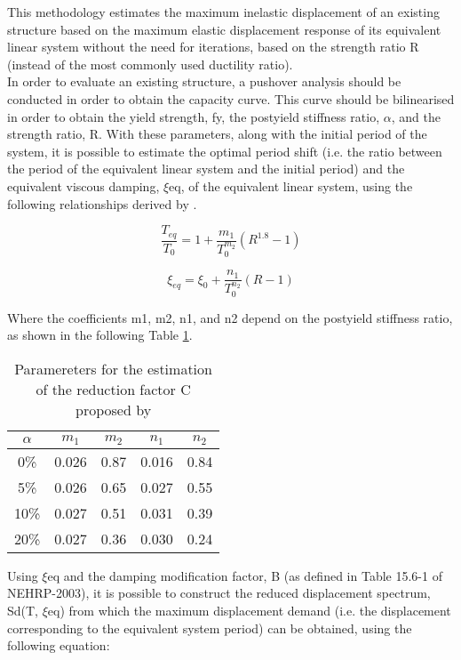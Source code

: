 This methodology estimates the maximum inelastic displacement of an existing structure based on the maximum elastic displacement response of its equivalent linear system without the need for iterations, based on the strength ratio R (instead of the most commonly used ductility ratio).\\
In order to evaluate an existing structure, a pushover analysis should be conducted in order to obtain the capacity curve. This curve should be bilinearised in order to obtain the yield strength, fy, the postyield stiffness ratio, $\alpha$, and the strength ratio, R. With these parameters, along with the initial period of the system, it is possible to estimate the optimal period shift (i.e. the ratio between the period of the equivalent linear system and the initial period) and the equivalent viscous damping, $\xi$eq, of the equivalent linear system, using the following relationships derived by \citep{LinMiranda2008}.
	 
\begin{equation}
\frac{T_{eq}}{T_{0}} = 1 + \frac{m_1}{T_0^{m_2}}\left(R^{1.8}-1\right)
\end{equation} 

\begin{equation}
\xi_{eq} = \xi_{0} + \frac{n_1}{T_0^{n_2}}\left(R-1\right)
\end{equation}   

Where the coefficients m1, m2, n1, and n2 depend on the postyield stiffness ratio, as shown in the following Table \ref{table:LinMiranda2008}.

\begin {table}[htb]
\caption{Paramereters for the estimation of the reduction factor C proposed by \citep{LinMiranda2008}} 
\label{table:LinMiranda2008} 
\begin{center}
  \begin{tabular}{ | c | c | c | c | c |}
    \hline
    $\alpha$ & $m_1$ & $m_2$ & $n_1$ & $n_2$ \\ \hline
    0\% & 0.026 & 0.87 & 0.016 & 0.84 \\ \hline
    5\% & 0.026 & 0.65 & 0.027 & 0.55 \\ \hline
    10\% & 0.027 & 0.51 & 0.031 & 0.39 \\ \hline
    20\% & 0.027 & 0.36 & 0.030 & 0.24 \\ \hline
  \end{tabular}
\end{center}
\end{table}
Using $\xi$eq and the damping modification factor, B (as defined in Table 15.6-1 of NEHRP-2003), it is possible to construct the reduced displacement spectrum, Sd(T, $\xi$eq) from which the maximum displacement demand (i.e. the displacement corresponding to the equivalent system period) can be obtained, using the following equation:
	  
